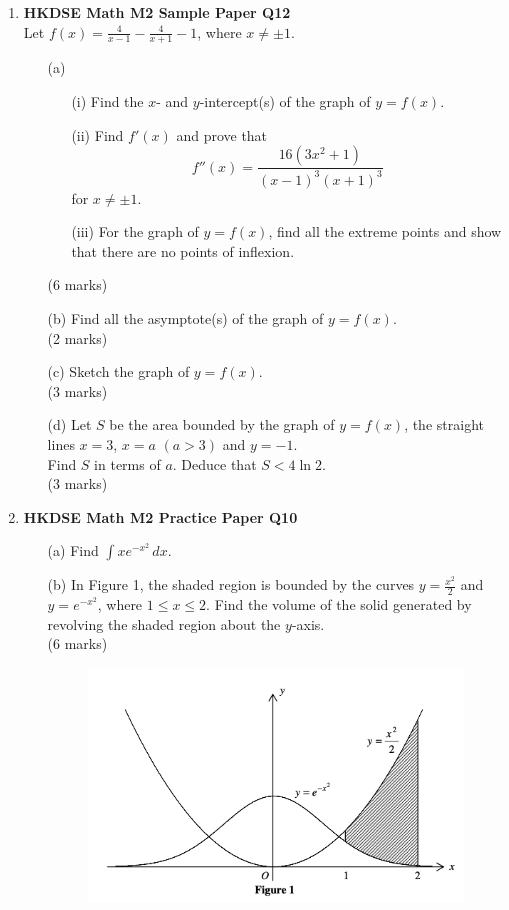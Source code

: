 \documentclass{report}
\begin{document}
\begin{enumerate}
	\item \textbf{HKDSE Math M2 Sample Paper Q12}\\
	Let $\displaystyle f(x) = \frac{4}{x-1} - \frac{4}{x+1} -1$, where $x \neq \pm 1$.
	\begin{enumerate}
		\item [(a)]
		\begin{enumerate}
			\item [(i)]Find the $x$- and $y$-intercept(s) of the graph of $y = f(x)$. 
			\item [(ii)]Find $f'(x)$ and prove that 
			$$f''(x) = \displaystyle\frac{16(3x^2 + 1)}{(x-1)^3(x+1)^3}$$
			for $x \neq \pm 1$. 
			\item [(iii)]For the graph of $y = f(x)$, find all the extreme points and show that there are no points of inflexion.
		\end{enumerate}
		(6 marks)
		\item [(b)]Find all the asymptote(s) of the graph of $y = f(x)$. \\(2 marks)
		\item [(c)]Sketch the graph of $y = f(x)$. \\(3 marks)
		\item [(d)]Let $S$ be the area bounded by the graph of $y = f(x)$, the straight lines $x = 3$, $x = a $ $(a > 3)$ and $y = -1$. \\
		Find $S$ in terms of $a$. Deduce that $S < 4\ln{2}$. \\(3 marks)
  	\end{enumerate}
	
	\newpage

	\item \textbf{HKDSE Math M2 Practice Paper Q10}
	\begin{enumerate}
		\item [(a)]Find $\displaystyle\int xe^{-x^2} \,dx$. 
		\item [(b)]In Figure 1, the shaded region is bounded by the curves $y = \displaystyle\frac{x^2}{2}$ and $y = e^{-x^2}$, where $1 \leq x \leq 2$. Find the volume of the solid generated by revolving the shaded region about the $y$-axis.\\
	(6 marks)
		\begin{figure}[H]
			\centering
			\includegraphics[width = .5\linewidth]{PPFigure1}
		\end{figure}
	\end{enumerate}


\end{enumerate}
\end{document}
